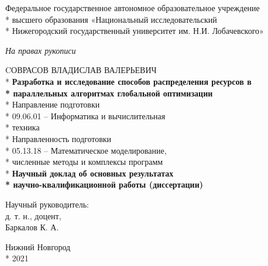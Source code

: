 \begin{titlepage}

  \begin{center}
    \fontsize{14pt}{0pt}

    Федеральное государственное автономное образовательное учреждение \\*
    высшего образования «Национальный исследовательский \\*
    Нижегородский государственный университет им. Н.И. Лобачевского»\\
  \end{center}

  \vspace{12pt}
  \vspace{25pt}

  \begin{center}
  \fontsize{14pt}{0pt}
  \textit{На правах рукописи\\}

  \vspace{12pt}

  CОВРАСОВ ВЛАДИСЛАВ ВАЛЕРЬЕВИЧ\\*
  \vspace{12pt}
  \vspace{25pt}
  \textbf{Разработка и исследование способов распределения ресурсов в\\*
  параллельных алгоритмах глобальной оптимизации}\\*
  \vspace{14pt}
  Направление подготовки\\*
  09.06.01 – Информатика и вычислительная\\*
  техника\\*
  \vspace{14pt}
  Направленность подготовки\\*
  05.13.18 – Математическое моделирование,\\*
  численные методы и комплексы программ\\*
  \vspace{14pt}
  \vspace{14pt}
  \textbf{Научный доклад об основных результатах\\*
  научно-квалификационной работы (диссертации)}
  \end{center}

  \vspace{40pt}


  \begin{flushright}
  Научный руководитель:\\
  д. т. н., доцент,\\
  Баркалов К. А.\\
  \end{flushright}

  \vspace{30pt}

  \vspace{\fill}

  \begin{center}
  Нижний Новгород \\*
  2021
  \end{center}

  \end{titlepage}
